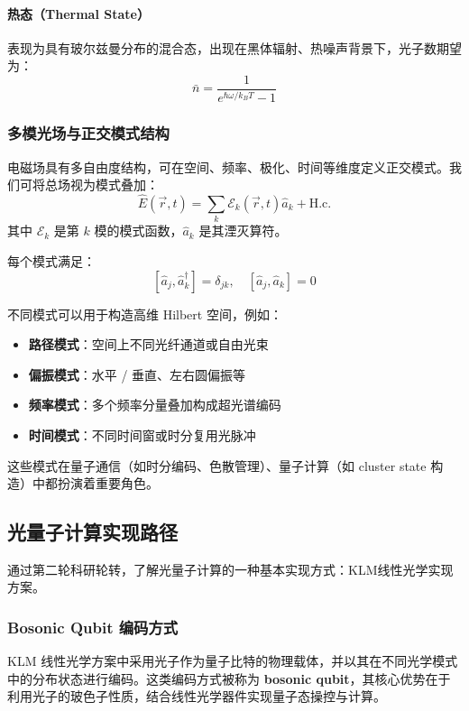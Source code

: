 \documentclass[hyperref, fntef, fancyhdr,zihao = -4,UTF8]{ctexart}
\begin{document}
\paragraph{热态（Thermal State）}
表现为具有玻尔兹曼分布的混合态，出现在黑体辐射、热噪声背景下，光子数期望为：
\[
\bar{n} = \frac{1}{e^{\hbar \omega / k_B T} - 1}
\]

\subsubsection{多模光场与正交模式结构}

电磁场具有多自由度结构，可在空间、频率、极化、时间等维度定义正交模式。我们可将总场视为模式叠加：
\[
\hat{E}(\vec{r}, t) = \sum_k \mathcal{E}_k(\vec{r}, t) \hat{a}_k + \text{H.c.}
\]
其中 $\mathcal{E}_k$ 是第 $k$ 模的模式函数，$\hat{a}_k$ 是其湮灭算符。\cite{arrazola2021quantum}

每个模式满足：
\[
[\hat{a}_j, \hat{a}_k^\dagger] = \delta_{jk}, \quad [\hat{a}_j, \hat{a}_k] = 0
\]

不同模式可以用于构造高维 Hilbert 空间，例如：
\begin{itemize}
  \item \textbf{路径模式}：空间上不同光纤通道或自由光束
  \item \textbf{偏振模式}：水平 / 垂直、左右圆偏振等
  \item \textbf{频率模式}：多个频率分量叠加构成超光谱编码
  \item \textbf{时间模式}：不同时间窗或时分复用光脉冲
\end{itemize}

这些模式在量子通信（如时分编码、色散管理）、量子计算（如 cluster state 构造）中都扮演着重要角色。




\subsection{光量子计算实现路径}
通过第二轮科研轮转，了解光量子计算的一种基本实现方式：KLM线性光学实现方案。

\subsubsection{Bosonic Qubit 编码方式}

KLM 线性光学方案中采用光子作为量子比特的物理载体，并以其在不同光学模式中的分布状态进行编码。这类编码方式被称为 \textbf{bosonic qubit}，其核心优势在于利用光子的玻色子性质，结合线性光学器件实现量子态操控与计算。
\end{document}
